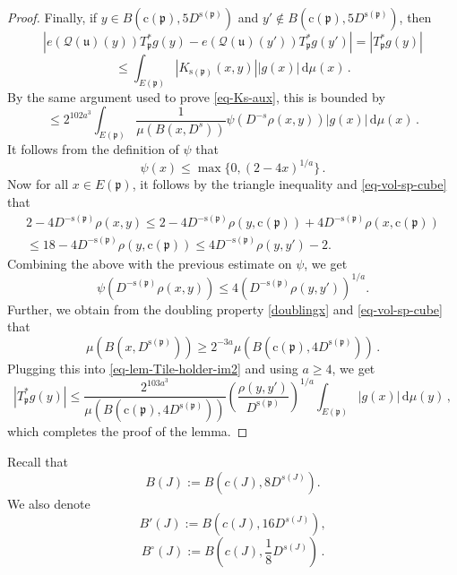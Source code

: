 \documentclass[10pt,a4paper]{article}
\theoremstyle{plain}
\theoremstyle{definition}
\numberwithin{equation}{subsection}
\newcommand{\fp}{{\mathfrak p}}
\newcommand{\fu}{{\mathfrak u}}
\newcommand{\pc}{{\mathrm{c}}}
\newcommand{\ps}{{\mathrm{s}}}
\newcommand{\fcc}{{\mathcal{Q}}}
\begin{document}
\begin{proof}
        Finally, if $y \in B(\pc(\fp), 5D^{\ps(\fp)})$ and $y' \notin B(\pc(\fp), 5D^{\ps(\fp)})$, then
        $$
            |e(\fcc(\fu)(y)) T_{\fp}^* g(y) - e(\fcc(\fu)(y')) T_{\fp}^* g(y')| = |T_{\fp}^* g(y)|
        $$
        $$
            \le \int_{E(\fp)} |K_{\ps(\fp)}(x,y)| |g(x)| \, \mathrm{d}\mu(x)\,.
        $$
        By the same argument used to prove \eqref{eq-Ks-aux}, this is bounded by
      \begin{equation}
            \label{eq-lem-Tile-holder-im2}
            \le 2^{102a^3} \int_{E(\fp)} \frac{1}{\mu(B(x, D^s))} \psi(D^{-s} \rho(x,y)) |g(x)| \, \mathrm{d}\mu(x)\,.
        \end{equation}
        It follows from the definition of $\psi$ that
        $$
            \psi(x) \le \max\{0, (2 - 4x)^{1/a}\}\,.
        $$
        Now for all $x\in E(\fp)$, it follows by the triangle inequality and \eqref{eq-vol-sp-cube} that
        \begin{multline*}
        2 - 4D^{-\ps(\fp)}\rho(x,y)\leq 2 - 4D^{-\ps(\fp)}\rho(y, \pc(\fp)) + 4 D^{-\ps(\fp)}\rho(x, \pc(\fp))\\\leq 18 - 4 D^{-\ps(\fp)} \rho(y, \pc(\fp)) \leq 4 D^{-\ps(\fp)}\rho(y,y') - 2 .
        \end{multline*}
        Combining the above with the previous estimate on $\psi$, we get
        $$
            \psi(D^{-\ps(\fp)}\rho(x,y)) \le 4 (D^{-\ps(\fp)}\rho(y,y'))^{1/a}.
        $$
        Further, we obtain from the doubling property \eqref{doublingx} and \eqref{eq-vol-sp-cube} that
        $$
            \mu(B(x, D^{\ps(\fp)})) \ge 2^{-3a} \mu(B(\pc(\fp), 4D^{\ps(\fp)}))\,.
        $$
        Plugging this into \eqref{eq-lem-Tile-holder-im2} and using $a \ge 4$, we get
        $$
            |T_{\fp}^* g(y)| \le \frac{2^{103a^3}}{\mu(B(\pc(\fp), 4D^{\ps(\fp)}))} \left(\frac{\rho(y,y')}{D^{\ps(\fp)}}\right)^{1/a} \int_{E(\fp)} |g(x)| \, \mathrm{d}\mu(y)\,,
        $$
        which completes the proof of the lemma.
    \end{proof}

    Recall that
    \begin{equation*}
        B(J) := B(c(J), 8D^{s(J)}).
    \end{equation*}
    We also denote
    \begin{equation*}
     B'(J) := B(c(J), 16D^{s(J)}),
    \end{equation*}
    \begin{equation*}
     B^\circ{}(J) := B(c(J), \frac{1}{8}D^{s(J)})\, .
    \end{equation*}
\end{document}
